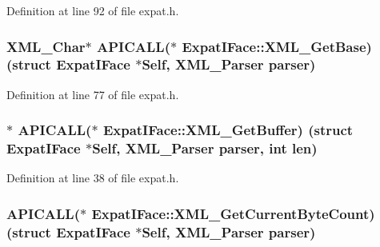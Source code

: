 Definition at line 92 of file expat.\+h.

\subsubsection[{\texorpdfstring{X\+M\+L\+\_\+\+Get\+Base}{XML_GetBase}}]{ {\bf X\+M\+L\+\_\+\+Char}$\ast$ A\+P\+I\+C\+A\+LL($\ast$ Expat\+I\+Face\+::\+X\+M\+L\+\_\+\+Get\+Base) (struct {\bf Expat\+I\+Face} $\ast$Self, {\bf X\+M\+L\+\_\+\+Parser} parser)}\hypertarget{struct_expat_i_face_a0dc7b5c567360867f6efa0e1868390df}{}\label{struct_expat_i_face_a0dc7b5c567360867f6efa0e1868390df}


Definition at line 77 of file expat.\+h.

\subsubsection[{\texorpdfstring{X\+M\+L\+\_\+\+Get\+Buffer}{XML_GetBuffer}}]{$\ast$ A\+P\+I\+C\+A\+LL($\ast$ Expat\+I\+Face\+::\+X\+M\+L\+\_\+\+Get\+Buffer) (struct {\bf Expat\+I\+Face} $\ast$Self, {\bf X\+M\+L\+\_\+\+Parser} parser, {\bf int} {\bf len})}\hypertarget{struct_expat_i_face_a5cc69aae8a6b6a9c0cf66228b19cab00}{}\label{struct_expat_i_face_a5cc69aae8a6b6a9c0cf66228b19cab00}


Definition at line 38 of file expat.\+h.

\subsubsection[{\texorpdfstring{X\+M\+L\+\_\+\+Get\+Current\+Byte\+Count}{XML_GetCurrentByteCount}}]{ A\+P\+I\+C\+A\+LL($\ast$ Expat\+I\+Face\+::\+X\+M\+L\+\_\+\+Get\+Current\+Byte\+Count) (struct {\bf Expat\+I\+Face} $\ast$Self, {\bf X\+M\+L\+\_\+\+Parser} parser)}\hypertarget{struct_expat_i_face_af4d0c8bc345694497e373deb3dc3f3cd}{}\label{struct_expat_i_face_af4d0c8bc345694497e373deb3dc3f3cd}


